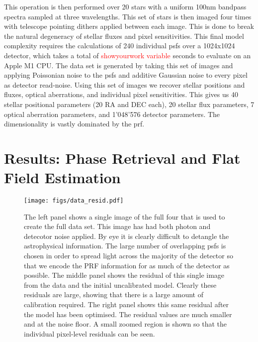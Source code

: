 \documentclass[twocolumn]{spie}
\begin{document}
This operation is then performed over 20 stars with a uniform 100nm bandpass spectra sampled at three wavelengths. This set of stars is then imaged four times with telescope pointing dithers applied between each image. This is done to break the natural degeneracy of stellar fluxes and pixel sensitivities. This final model complexity requires the calculations of 240 individual \ac{psf}s over a 1024x1024 detector, which takes a total of \textcolor{red}{showyourwork variable} seconds to evaluate on an Apple M1 CPU. The data set is generated by taking this set of images and applying Poissonian noise to the \ac{psf}s and additive Gaussian noise to every pixel as detector read-noise. Using this set of images we recover stellar positions and fluxes, optical aberrations, and individual pixel sensitivities. This gives us 40 stellar positional parameters (20 RA and DEC each), 20 stellar flux parameters, 7 optical aberration parameters, and 1'048'576 detector parameters. The dimensionality is vastly dominated by the \ac{prf}.



\section{Results: Phase Retrieval and Flat Field Estimation}
\label{sec:phaseretrieval}



\begin{figure*}
    \centering
    \texttt{[image: figs/data\_resid.pdf]}
    \caption{The left panel shows a single image of the full four that is used to create the full data set. This image has had both photon and detecotor noise applied. By eye it is clearly difficult to detangle the astrophysical information. The large number of overlapping \ac{psf}s is chosen in order to spread light across the majority of the detector so that we encode the PRF information for as much of the detector as possible. The middle panel shows the residual of this single image from the data and the initial uncalibrated model. Clearly these residuals are large, showing that there is a large amount of calibration required. The right panel shows this same residual after the model has been optimised. The residual values are much smaller and at the noise floor. A small zoomed region is shown so that the individual pixel-level residuals can be seen.}
    \label{fig:data_residual}
\end{figure*}
\end{document}
